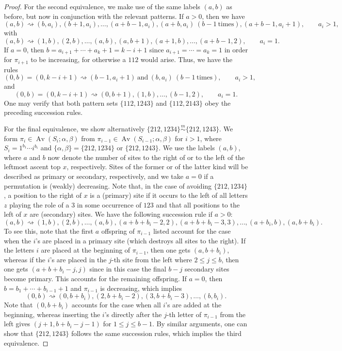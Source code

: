 \documentclass[11pt]{amsart}
\theoremstyle{plain}
\theoremstyle{definition}
\newcommand{\csim}{\stackrel{m}{\sim}}
\DeclareMathOperator{\Av}{Av}
\begin{document}
\begin{proof}
For the second equivalence, we make use of the same labels $(a,b)$ as before, but now in conjunction
with the relevant patterns.  If $a>0$, then we have
$$(a,b)\rightsquigarrow(b,a_i),(b+1,a_i),\ldots,(a+b-1,a_i),(a+b,a_i)~(b-1~\text{times}),(a+b-1,
a_i+1), \qquad a_i>1,$$
with
$$(a,b)\rightsquigarrow(1,b),(2,b),\ldots,(a,b),(a,b+1),(a+1,b),\ldots,(a+b-1,2), \qquad a_i=1.$$
If $a=0$, then $b=a_{i+1}+\cdots+a_k+1=k-i+1$ since $a_{i+1}=\cdots=a_k=1$ in order for $\pi_{i+1}$
to be increasing, for otherwise a $112$ would arise.  Thus, we have the rules
$$(0,b)=(0,k-i+1)\rightsquigarrow (b-1,a_i+1)~\text{and}~(b,a_i)~(b-1~\text{times}), \qquad a_i>1,$$
and
$$(0,b)=(0,k-i+1)\rightsquigarrow(0,b+1),(1,b),\ldots,(b-1,2), \qquad a_i=1.$$
One may verify that both pattern sets $\{112,1243\}$ and $\{112,2143\}$ obey the preceding
succession rules.

For the final equivalence, we show alternatively $\{212,1234\}\csim\{212,1243\}$.  We form $\pi_i
\in \Av(S_i;\alpha,\beta)$ from $\pi_{i-1} \in \Av(S_{i-1};\alpha,\beta)$ for $i>1$, where
$S_i=1^{b_1}\cdots i^{b_i}$ and $\{\alpha,\beta\}=\{212,1234\}$ or $\{212,1243\}$.  We use the
labels $(a,b)$, where $a$ and $b$ now denote the number of sites to the right of or to the left of
the leftmost ascent top $x$, respectively.  Sites of the former or of the latter kind will be
described as primary or secondary, respectively, and we take $a=0$ if a permutation is (weakly)
decreasing.  Note that, in the case of avoiding $\{212,1234\}$, a position to the right of $x$ is a
(primary) site if it occurs to the left of all letters $z$  playing the role of a $3$ in some
occurrence of $123$ and that all positions to the left of $x$ are (secondary) sites.  We have the
following succession rule if
$a>0$:$$(a,b)\rightsquigarrow(1,b),(2,b),\ldots,(a,b),(a+b+b_i-2,2),(a+b+b_i-3,3),\ldots,(a+b_i,b),(a
,b+b_i).$$
To see this, note that the first $a$ offspring of $\pi_{i-1}$ listed account for the case when the
$i$'s are placed in a primary site (which destroys all sites to the right).  If the letters $i$ are
placed at the beginning of $\pi_{i-1}$, then one gets $(a,b+b_i)$, whereas if the $i$'s are placed in
the $j$-th site from the left where $2 \leq j \leq b$, then one gets $(a+b+b_i-j,j)$ since in this
case the final $b-j$ secondary sites become primary.  This accounts for the remaining offspring.  If
$a=0$, then $b=b_1+\cdots+b_{i-1}+1$ and $\pi_{i-1}$ is decreasing, which implies
$$(0,b)\rightsquigarrow (0,b+b_i),(2,b+b_i-2),(3,b+b_i-3),\ldots,(b,b_i).$$
Note that $(0,b+b_i)$ accounts for the case when all $i$'s are added at the beginning, whereas
inserting the $i$'s directly after the $j$-th letter of $\pi_{i-1}$ from the left gives
$(j+1,b+b_i-j-1)$ for $1 \leq j \leq b-1$.  By similar arguments, one can show that $\{212,1243\}$
follows the same succession rules, which implies the third equivalence.
 \end{proof}
\end{document}
